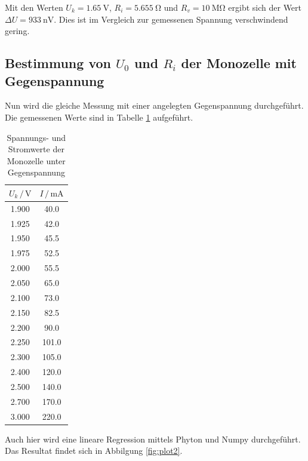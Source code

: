 Mit den Werten $U_k = \SI{1.65}{\volt}$, $R_i = \SI{5.655}{\ohm}$ und 
$R_v = \SI{10}{\mega\ohm}$ ergibt sich der Wert $\Delta U = \SI{933}{\nano\volt}$.
Dies ist im Vergleich zur gemessenen Spannung verschwindend gering.

\subsection{Bestimmung von $U_0$ und $R_i$ der Monozelle mit Gegenspannung}

Nun wird die gleiche Messung mit einer angelegten Gegenspannung durchgeführt.
Die gemessenen Werte sind in Tabelle \ref{tab:Gegen} aufgeführt.

\begin{table}
  \centering
  \caption{Spannungs- und Stromwerte der Monozelle unter Gegenspannung}
  \label{tab:Gegen}
  \begin{tabular}{c c}
    \toprule
     $U_k \,/\, \si{\volt}$ & $I \,/\, \si{\milli\ampere}$\\
    \midrule
      1.900 &  40.0\\
      1.925 &  42.0\\
      1.950 &  45.5\\
      1.975 &  52.5\\
      2.000 &  55.5\\
      2.050 &  65.0\\
      2.100 &  73.0\\
      2.150 &  82.5\\
      2.200 &  90.0\\
      2.250 & 101.0\\
      2.300 & 105.0\\
      2.400 & 120.0\\
      2.500 & 140.0\\
      2.700 & 170.0\\
      3.000 & 220.0\\
    \bottomrule
  \end{tabular}
\end{table}

Auch hier wird eine lineare Regression mittels Phyton und Numpy durchgeführt.
Das Resultat findet sich in Abbilgung \ref{fig:plot2}.

